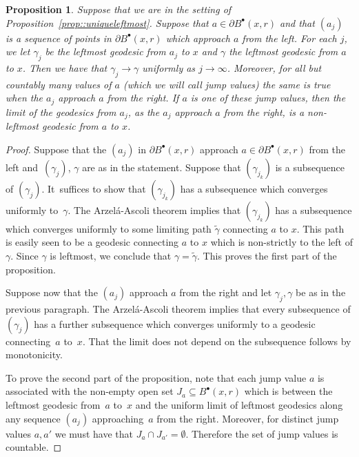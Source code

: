\documentclass[10pt]{amsart}
\newcommand{\sbullet}{{\scriptscriptstyle\bullet}}
\theoremstyle{plain}
\numberwithin{theorem}{section}
\newtheorem{proposition}[theorem]{Proposition}
\theoremstyle{definition}
\let\wt\widetilde
\newcommand{\fb}[2]{B^\sbullet(#1,#2)}
\begin{document}
\begin{proposition}
\label{prop::leftmostconvergence}
Suppose that we are in the setting of Proposition~\ref{prop::uniqueleftmost}. Suppose that $a \in \partial \fb{x}{r}$ and that $(a_j)$ is a sequence of points in $\partial \fb{x}{r}$ which approach $a$ from the left. For each $j$, we let $\gamma_j$ be the leftmost geodesic from $a_j$ to $x$ and $\gamma$ the leftmost geodesic from $a$ to $x$. Then we have that $\gamma_j \to \gamma$ uniformly as $j \to \infty$. Moreover, for all but countably many values of $a$ (which we will call \emph{jump values}) the same is true when the $a_j$ approach $a$ from the right. If $a$ is one of these jump values, then the limit of the geodesics from $a_j$, as the $a_j$ approach $a$ from the right, is a non-leftmost geodesic from $a$ to $x$.
\end{proposition}
\begin{proof}
Suppose that the $(a_j)$ in $\partial \fb{x}{r}$ approach $a \in \partial \fb{x}{r}$ from the left and~$(\gamma_j)$, $\gamma$ are as in the statement. Suppose that $(\gamma_{j_k})$ is a subsequence of $(\gamma_j)$. It~suffices to show that $(\gamma_{j_k})$ has a subsequence which converges uniformly to~$\gamma$. The Arzelá-Ascoli theorem implies that $(\gamma_{j_k})$ has a subsequence which converges uniformly to some limiting path $\wt{\gamma}$ connecting $a$ to $x$. This path is easily seen to be a geodesic connecting $a$ to $x$ which is non-strictly to the left of $\gamma$. Since $\gamma$ is leftmost, we conclude that $\gamma = \wt{\gamma}$. This proves the first part of the proposition.

Suppose now that the $(a_j)$ approach $a$ from the right and let $\gamma_j,\gamma$ be as in the previous paragraph. The Arzelá-Ascoli theorem implies that every subsequence of $(\gamma_j)$ has a further subsequence which converges uniformly to a geodesic connecting~$a$ to~$x$. That the limit does not depend on the subsequence follows by monotonicity.

To prove the second part of the proposition, note that each jump value $a$ is associated with the non-empty open set $J_a \subseteq \fb{x}{r}$ which is between the leftmost geodesic from~$a$ to~$x$ and the uniform limit of leftmost geodesics along any sequence $(a_j)$ approaching~$a$ from the right. Moreover, for distinct jump values $a,a'$ we must have that $J_a \cap J_{a'} = \emptyset$. Therefore the set of jump values is countable.
\end{proof}
\end{document}
